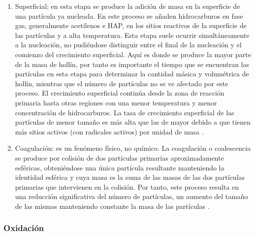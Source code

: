 \begin{enumerate}
\item Superficial: en esta etapa se produce la adición de masa en la superficie de una partícula ya nucleada. En este proceso se añaden hidrocarburos en fase gas, generalmente acetilenos e HAP, en los sitios reactivos de la superficie de las partículas y a alta temperatura. Esta etapa suele ocurrir simultáneamente a la nucleación, no pudiéndose distinguir entre el final de la nucleación y el comienzo del crecimiento superficial. Aquí es donde se produce la mayor parte de la masa de hollín, por tanto es importante el tiempo que se encuentran las partículas en esta etapa para determinar la cantidad másica y volumétrica de hollín, mientras que el número de partículas no se ve afectado por este proceso. El crecimiento superficial continúa desde la zona de reacción primaria hasta otras regiones con una menor temperatura y menor concentración de hidrocarburos. La tasa de crecimiento superficial de las partículas de menor tamaño es más alta que las de mayor debido a que tienen más sitios activos (con radicales activos) por unidad de masa \cite{hiroyasuetal:1976}.  

\item Coagulación: es un fenómeno físico, no químico. La coagulación o coalescencia se produce por colisión de dos partículas primarias aproximadamente esféricas, obteniéndose una única partícula resultante manteniendo la identidad esférica y cuya masa es la suma de las masas de las dos partículas primarias que intervienen en la colisión. Por tanto, este proceso resulta en una reducción significativa del número de partículas, un aumento del tamaño de las mismas manteniendo constante la masa de las partículas \cite{haynessetal:1981}. 
\end{enumerate}

\subsubsection{Oxidación}\label{subsubsec:oxidacion}

